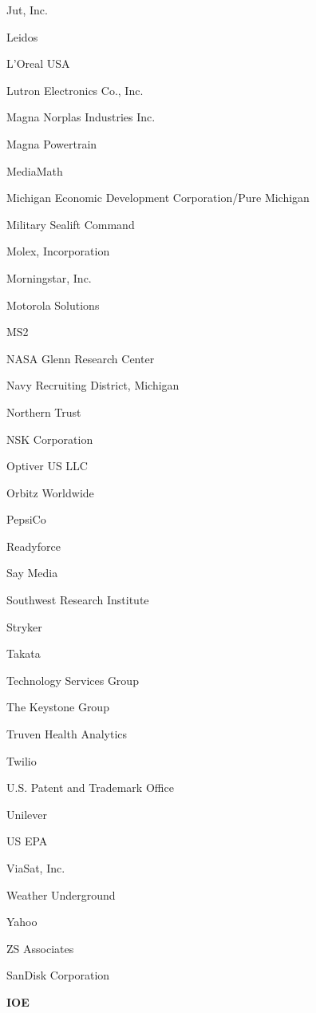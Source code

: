 \documentclass[twoside]{article}
\begin{document}
\begin{center}
\begin{multicols}{5}
\begin{FlushLeft}
\begin{compactitem}
\item Jut, Inc.
\item Leidos
\item L'Oreal USA
\item Lutron Electronics Co., Inc.
\item Magna Norplas Industries Inc.
\item Magna Powertrain
\item MediaMath
\item Michigan Economic Development Corporation/Pure Michigan
\item Military Sealift Command
\item Molex, Incorporation
\item Morningstar, Inc.
\item Motorola Solutions
\item MS2
\item NASA Glenn Research Center
\item Navy Recruiting District, Michigan
\item Northern Trust
\item NSK Corporation
\item Optiver US LLC
\item Orbitz Worldwide
\item PepsiCo
\item Readyforce
\item Say Media
\item Southwest Research Institute
\item Stryker
\item Takata
\item Technology Services Group
\item The Keystone Group
\item Truven Health Analytics
\item Twilio
\item U.S. Patent and Trademark Office
\item Unilever
\item US EPA
\item ViaSat, Inc.
\item Weather Underground
\item Yahoo
\item ZS Associates
\item SanDisk Corporation
\end{compactitem}
        \end{FlushLeft}
        \vspace{1em}
        {\fontsize{14}{16}\selectfont \bf IOE}\\

\end{multicols}
\end{center}
\end{document}
